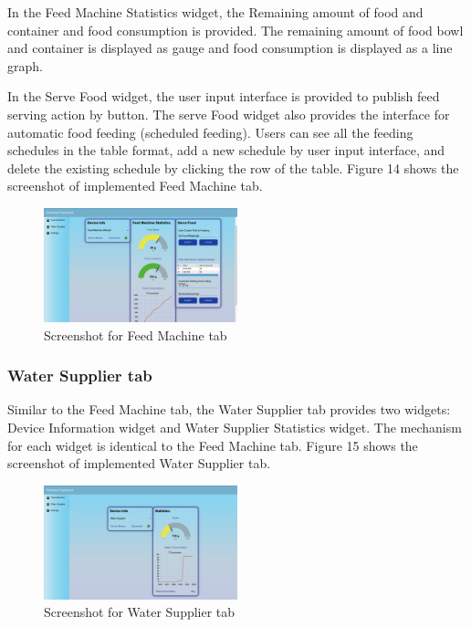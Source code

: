 \documentclass[conference]{IEEEtran}
\begin{document}
In the Feed Machine Statistics widget, the Remaining amount of food and container and food consumption is provided. The remaining amount of food bowl and container is displayed as gauge and food consumption is displayed as a line graph.

In the Serve Food widget, the user input interface is provided to publish feed serving action by button. The serve Food widget also provides the interface for automatic food feeding (scheduled feeding). Users can see all the feeding schedules in the table format, add a new schedule by user input interface, and delete the existing schedule by clicking the row of the table. Figure 14 shows the screenshot of implemented Feed Machine tab.

\begin{figure}[htbp]
\centerline{\includegraphics[width=0.5\textwidth]{./images/feed_machine_ui.png}}
\caption{Screenshot for Feed Machine tab}
\label{fig}
\end{figure}

\subsubsection{Water Supplier tab}
Similar to the Feed Machine tab, the Water Supplier tab provides two widgets: Device Information widget and Water Supplier Statistics widget. The mechanism for each widget is identical to the Feed Machine tab. Figure 15 shows the screenshot of implemented Water Supplier tab.

\begin{figure}[htbp]
\centerline{\includegraphics[width=0.5\textwidth]{./images/water_supplier_ui.png}}
\caption{Screenshot for Water Supplier tab}
\label{fig}
\end{figure}
\end{document}
